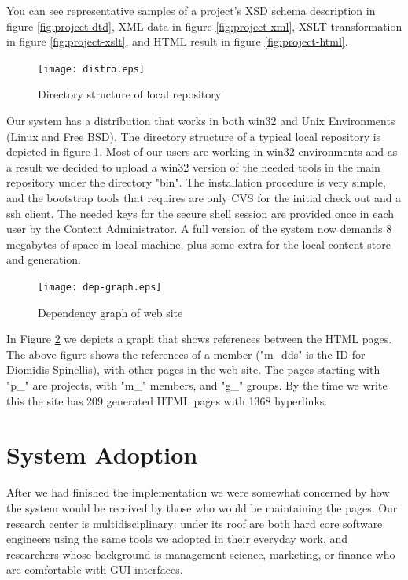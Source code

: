 \documentclass[10pt]{article}
\begin{document}
You can see representative samples of a project's
XSD schema description in figure \ref{fig:project-dtd},
XML data in figure \ref{fig:project-xml},
XSLT transformation in figure \ref{fig:project-xslt},
and HTML result in figure \ref{fig:project-html}.

\begin{figure}
\texttt{[image: distro.eps]}
\caption{Directory structure of local repository}
\label{fig:eltrun-web-distro}
\end{figure}

Our system has a distribution that works in both win32 and 
Unix Environments (Linux and Free BSD). The directory structure of a typical local repository is depicted in
figure \ref{fig:eltrun-web-distro}.
Most of our users are working in win32 environments and as 
a result we decided to upload a win32 version of the needed tools 
in the main repository under the directory "bin". The installation procedure is very simple,
and the bootstrap tools that requires are only CVS for 
the initial check out and a ssh client. The needed keys 
for the secure shell session are provided once in each user by the Content Administrator. 
A full version of the system now demands 8 megabytes of space 
in local machine, plus some extra for the local content store and generation.

\begin{figure}
\texttt{[image: dep-graph.eps]}
\caption{Dependency graph of web site}
\label{fig:eltrun-web-m-dds-snapshot}
\end{figure}

In Figure \ref{fig:eltrun-web-m-dds-snapshot} we depicts a graph that shows references between the HTML pages.
The above figure shows the references  of a member ("m\_dds" is the ID for Diomidis Spinellis), with other pages in the web site.
The pages starting with "p\_" are projects, with "m\_" members, and "g\_" groups.
By the time we write this the site has 209 generated HTML pages with 1368 hyperlinks. 

\section{System Adoption}
\label{sec:adopt}
After we had finished the implementation we were somewhat concerned
by how the system would be received by those who would be
maintaining the pages.
Our research center is multidisciplinary: under its roof
are both hard core software engineers using the same tools
we adopted in their everyday work, and researchers whose
background is management science, marketing, or finance
who are comfortable with GUI interfaces.
\end{document}

